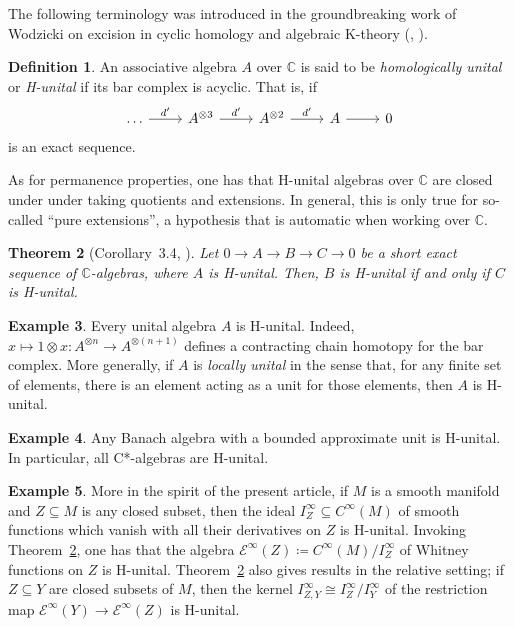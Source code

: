 \documentclass[12pt]{article}
\theoremstyle{plain}
\newtheorem{thm}{Theorem}[section]
\theoremstyle{definition}
\newtheorem{defn}[thm]{Definition}
\newtheorem{ex}[thm]{Example}
\newcommand{\C}{\mathbb{C}}
\numberwithin{equation}{section}
\begin{document}
The following terminology was introduced in the groundbreaking work of  Wodzicki  on excision in  cyclic homology and algebraic K-theory (\cite{Wodzicki2}, \cite{Wodzicki}).


\begin{defn}
An associative algebra $A$ over $\C$ is said to be \emph{homologically unital} or \emph{H-unital} if its bar complex  is acyclic. That is, if
\[ 
\begin{tikzcd}
\ldots \ar[r,"{d'}"]  & A^{\otimes 3} \ar[r,"{d'}"] & A^{\otimes 2} \ar[r,"{d'}"] & A \ar[r] & 0 
\end{tikzcd}\]
is an exact sequence.
\end{defn}

As for permanence properties, one has that H-unital algebras over $\C$ are closed under under taking quotients and extensions. In general, this is only true for so-called ``pure extensions'', a hypothesis that is automatic when working over $\C$.


\begin{thm}[Corollary~3.4, \cite{Wodzicki}]\label{permanence}
Let  $0 \to A \to B \to C \to 0$ be a short exact sequence of $\C$-algebras, where  $A$  is H-unital. Then, $B$ is H-unital if and only if $C$ is H-unital.
\end{thm}


\begin{ex}
Every unital algebra $A$ is H-unital. Indeed, $x \mapsto 1 \otimes x : A^{\otimes n} \to A^{\otimes (n+1)}$ defines a contracting chain homotopy for the bar complex. More generally, if $A$ is \emph{locally unital} in the sense that, for any finite set of elements, there is an element acting as a unit for those elements, then $A$ is  H-unital. 
\end{ex}
\begin{ex}Any Banach algebra with a bounded approximate unit is H-unital. In particular, all C*-algebras are H-unital. 
\end{ex}


\begin{ex}
More in the spirit of the present article, if $M$ is a smooth manifold and $Z \subseteq M$ is any closed subset, then the ideal $I_Z^\infty \subseteq C^\infty(M)$ of smooth functions which vanish with all their derivatives on $Z$ is H-unital. Invoking Theorem~\ref{permanence}, one has that the algebra $\mathcal{E}^\infty(Z)\coloneqq C^\infty(M)/I_Z^\infty$ of Whitney functions on $Z$ is H-unital. Theorem~\ref{permanence} also gives results in the relative setting; if $Z \subseteq Y$ are closed subsets of $M$, then the kernel $I^\infty_{Z, Y} \cong I^\infty_Z/I^\infty_Y$ of the restriction map $\mathcal{E}^\infty(Y) \to \mathcal{E}^\infty(Z)$ is H-unital. 
\end{ex}
\end{document}
